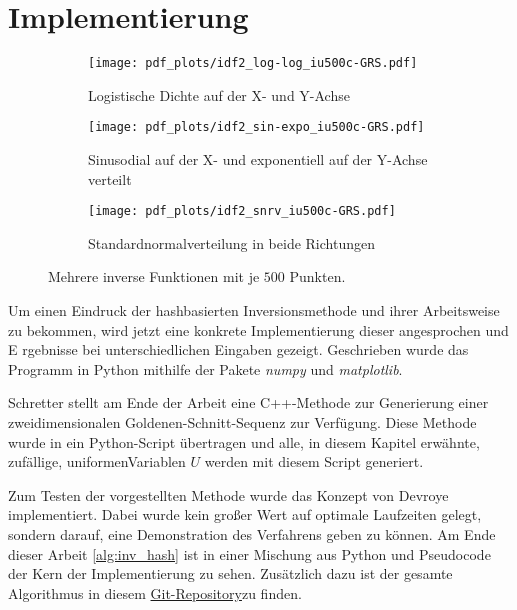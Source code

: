 \section{Implementierung}
\label{impl}
\begin{figure*}%
    \centering
    \begin{subfigure}[b]{.3\textwidth}
        \centering
        \texttt{[image: pdf\_plots/idf2\_log-log\_iu500c-GRS.pdf]}
        \caption{Logistische Dichte auf der X- und Y-Achse}
        \label{fig:loglog_examplePlot}
    \end{subfigure}
    \hfill
    \begin{subfigure}[b]{.3\textwidth}
        \centering
        \texttt{[image: pdf\_plots/idf2\_sin-expo\_iu500c-GRS.pdf]}
        \caption{Sinusodial auf der X- und exponentiell auf der Y-Achse verteilt}
        \label{fig:sinexpo_examplePlot}
    \end{subfigure}
    \hfill
    \begin{subfigure}[b]{.3\textwidth}
        \centering
        \texttt{[image: pdf\_plots/idf2\_snrv\_iu500c-GRS.pdf]}
        \caption{Standardnormalverteilung in beide Richtungen}
        \label{fig:snrv_examplePlot}
    \end{subfigure}
    \caption{Mehrere inverse Funktionen mit je $500$ Punkten.}
    \label{fig:examplePlot}
\end{figure*}

Um einen Eindruck der hashbasierten Inversionsmethode und ihrer Arbeitsweise zu 
bekommen, wird jetzt eine konkrete Implementierung dieser angesprochen und E
rgebnisse bei unterschiedlichen Eingaben gezeigt. Geschrieben wurde das Programm 
in Python mithilfe der Pakete \textit{numpy} und \textit{matplotlib}.

Schretter \cite{schretter-golden_ratio_sequences-2012} stellt am Ende der Arbeit 
eine C++-Methode zur Generierung einer zweidimensionalen Goldenen-Schnitt-Sequenz 
zur Verfügung. Diese Methode wurde in ein Python-Script übertragen und alle, in 
diesem Kapitel erwähnte, zufällige, uniformenVariablen $U$ werden mit diesem Script 
generiert.

Zum Testen der vorgestellten Methode wurde das Konzept von Devroye \cite{devroye-non_uniform_random_variate-1986} 
implementiert. Dabei wurde kein großer Wert auf optimale Laufzeiten gelegt, sondern 
darauf, eine Demonstration des Verfahrens geben zu können. Am Ende dieser Arbeit \ref{alg:inv_hash}
ist in einer Mischung aus Python und Pseudocode der Kern der Implementierung zu 
sehen. Zusätzlich dazu ist der gesamte Algorithmus in diesem \href{https:github.com/knirschl/Proseminar-Anthropomatik}
{Git-Repository}zu finden. 

